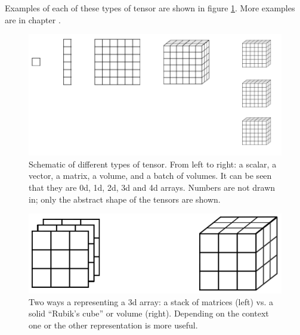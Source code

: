
Examples of each of these types of tensor are shown in figure \ref{tensorTypes}. More examples are in chapter .

\begin{figure}[h]
\centering
\includegraphics[scale=0.6]{./images/tensorTypes.png}
\caption[Soraya Boza.]{Schematic of different types of tensor. From left to right: a scalar, a vector, a matrix, a volume, and a batch of volumes. It can be seen that they are 0d, 1d, 2d, 3d and 4d arrays.  Numbers are not drawn in; only the abstract shape of the tensors are shown.} 
\label{tensorTypes}
\end{figure}

\begin{figure}[h]
\centering
\includegraphics[scale=0.3]{./images/tensorVisualStyles.png}
\caption[Soraya Boza.]{Two ways a representing a 3d array: a stack of matrices (left) vs. a solid ``Rubik's cube''  or volume (right). Depending on the context one or the other representation is more useful.} 
\label{tensorVisualStyles}
\end{figure}

